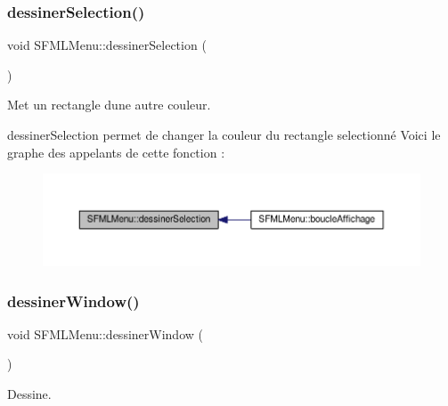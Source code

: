\subsubsection{\texorpdfstring{dessiner\+Selection()}{dessinerSelection()}}
{\footnotesize\ttfamily void S\+F\+M\+L\+Menu\+::dessiner\+Selection (\begin{DoxyParamCaption}{ }\end{DoxyParamCaption})\hspace{0.3cm}{\ttfamily [private]}}



Met un rectangle d\textquotesingle{}une autre couleur. 

dessiner\+Selection permet de changer la couleur du rectangle selectionné Voici le graphe des appelants de cette fonction \+:\nopagebreak
\begin{figure}[H]
\begin{center}
\leavevmode
\includegraphics[width=350pt]{class_s_f_m_l_menu_a9277783624a1058bfa5cb7e9dbc16d5c_icgraph}
\end{center}
\end{figure}
\mbox{\label{class_s_f_m_l_menu_a5f87fa77e5029f1d2127e6796c6b6fd1}} 
\subsubsection{\texorpdfstring{dessiner\+Window()}{dessinerWindow()}}
{\footnotesize\ttfamily void S\+F\+M\+L\+Menu\+::dessiner\+Window (\begin{DoxyParamCaption}{ }\end{DoxyParamCaption})\hspace{0.3cm}{\ttfamily [private]}}



Dessine. 

